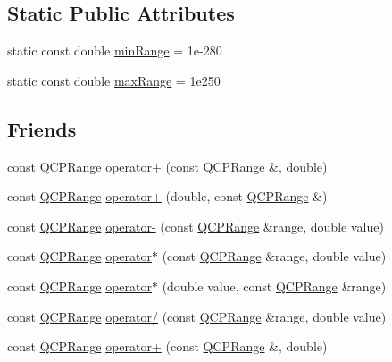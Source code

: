 \subsection*{Static Public Attributes}
\begin{DoxyCompactItemize}
\item 
static const double \hyperlink{class_q_c_p_range_a95e4931d712418c3020517cbec669ed1}{min\+Range} = 1e-\/280
\item 
static const double \hyperlink{class_q_c_p_range_a34c2817056d5eb5c32524e34a85b4255}{max\+Range} = 1e250
\end{DoxyCompactItemize}
\subsection*{Friends}
\begin{DoxyCompactItemize}
\item 
const \hyperlink{class_q_c_p_range}{Q\+C\+P\+Range} \hyperlink{class_q_c_p_range_af53ea6fb823a4a5897162b865841de04}{operator+} (const \hyperlink{class_q_c_p_range}{Q\+C\+P\+Range} \&, double)
\item 
const \hyperlink{class_q_c_p_range}{Q\+C\+P\+Range} \hyperlink{class_q_c_p_range_a9fb2e9941d32001482df670c0d704977}{operator+} (double, const \hyperlink{class_q_c_p_range}{Q\+C\+P\+Range} \&)
\item 
const \hyperlink{class_q_c_p_range}{Q\+C\+P\+Range} \hyperlink{class_q_c_p_range_a797f82830b516646da8873f82e39e356}{operator-\/} (const \hyperlink{class_q_c_p_range}{Q\+C\+P\+Range} \&range, double value)
\item 
const \hyperlink{class_q_c_p_range}{Q\+C\+P\+Range} \hyperlink{class_q_c_p_range_a558b1248ff6a9e41fd5b2630555a8acc}{operator$\ast$} (const \hyperlink{class_q_c_p_range}{Q\+C\+P\+Range} \&range, double value)
\item 
const \hyperlink{class_q_c_p_range}{Q\+C\+P\+Range} \hyperlink{class_q_c_p_range_a5cb2332f6957021f47cc768089f4f090}{operator$\ast$} (double value, const \hyperlink{class_q_c_p_range}{Q\+C\+P\+Range} \&range)
\item 
const \hyperlink{class_q_c_p_range}{Q\+C\+P\+Range} \hyperlink{class_q_c_p_range_a4b366a3a21974c88e09b0d39d4a24a4b}{operator/} (const \hyperlink{class_q_c_p_range}{Q\+C\+P\+Range} \&range, double value)
\item 
const \hyperlink{class_q_c_p_range}{Q\+C\+P\+Range} \hyperlink{class_q_c_p_range_af53ea6fb823a4a5897162b865841de04}{operator+} (const \hyperlink{class_q_c_p_range}{Q\+C\+P\+Range} \&, double)

\end{DoxyCompactItemize}
